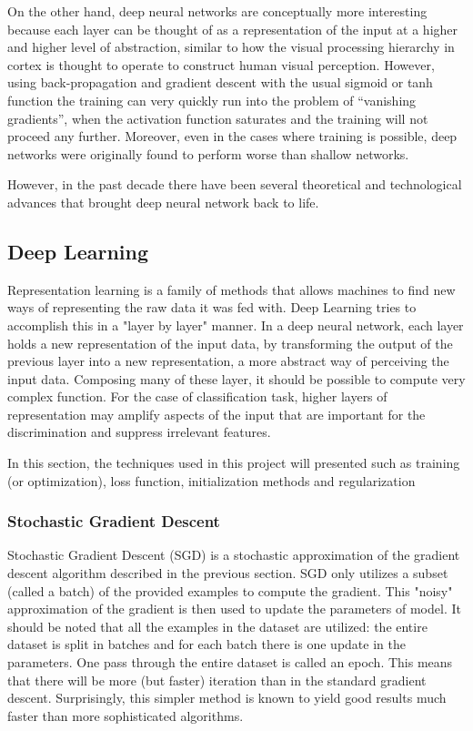 On the other hand, deep neural networks are conceptually more interesting because each layer can be thought of as a representation of the input at a higher and higher level of abstraction, similar to how the visual processing hierarchy in cortex is thought to operate to construct human visual perception. However, using back-propagation and gradient descent with the usual sigmoid or tanh function the training can very quickly run into the problem of “vanishing gradients”, when the activation function saturates and the training will not proceed any further. Moreover, even in the cases where training is possible, deep networks were originally found to perform worse than shallow networks. \cite{NNDL} \cite{Larochelleyoutube}

However, in the past decade there have been several theoretical and technological advances that brought deep neural network back to life.

\subsection{Deep Learning}
\label{subsec:Deep-Learning}
Representation learning is a family of methods that allows machines to find new ways of representing the raw data it was fed with. Deep Learning tries to accomplish this in a "layer by layer" manner. In a deep neural network, each layer holds a new representation of the input data, by transforming the output of the previous layer into a new representation, a more abstract way of perceiving the input data. Composing many of these layer, it should be possible to compute very complex function. For the case of classification task, higher layers of representation may amplify aspects of the input that are important for the discrimination and suppress irrelevant features. \cite{lecun2015deep}

In this section, the techniques used in this project will presented such as training (or optimization), loss function, initialization methods and regularization

\subsubsection{Stochastic Gradient Descent}
\label{subsubsec:SGD}
Stochastic Gradient Descent (SGD) is a stochastic approximation of the gradient descent algorithm described in the previous section. SGD only utilizes a subset (called a batch) of the provided examples to compute the gradient. This "noisy" approximation of the gradient is then used to update the parameters of model. It should be noted that all the examples in the dataset are utilized: the entire dataset is split in batches and for each batch there is one update in the parameters. One pass through the entire dataset is called an epoch. This means that there will be more (but faster) iteration than in the standard gradient descent. Surprisingly, this simpler method is known to yield good results much faster than more sophisticated algorithms.

